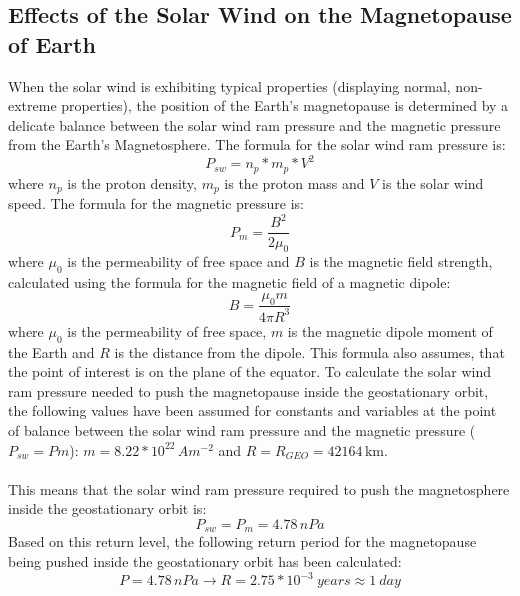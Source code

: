 \documentclass[12pt]{article}
\begin{document}
    \subsection{Effects of the Solar Wind on the Magnetopause of Earth}\label{sec:magnetoPAUSE}
        When the solar wind is exhibiting typical properties (displaying normal, non-extreme properties), the position of the Earth's magnetopause is determined by a delicate balance between the solar wind ram pressure and the magnetic pressure from the Earth's Magnetosphere. The formula for the solar wind ram pressure is:
        \begin{equation}
            P_{sw}=n_p*m_p*V^2
        \end{equation}
        where $n_p$ is the proton density, $m_p$ is the proton mass and $V$ is the solar wind speed. The formula for the magnetic pressure is:
        \begin{equation}
            P_{m}=\frac{B^2}{2\mu_0}
        \end{equation}
        where $\mu_0$ is the permeability of free space and $B$ is the magnetic field strength, calculated using the formula for the magnetic field of a magnetic dipole:
        \begin{equation}
            B=\frac{\mu_0m}{4\pi R^3}
        \end{equation}
        where $\mu_0$ is the permeability of free space, $m$ is the magnetic dipole moment of the Earth and $R$ is the distance from the dipole. This formula also assumes, that the point of interest is on the plane of the equator. To calculate the solar wind ram pressure needed to push the magnetopause inside the geostationary orbit, the following values have been assumed for constants and variables at the point of balance between the solar wind ram pressure and the magnetic pressure ($P_{sw}=P{m}$): $m=8.22*10^{22}\,Am^{-2}$ and $R=R_{GEO}=42164\,$km.\\ \\
        This means that the solar wind ram pressure required to push the magnetosphere inside the geostationary orbit is:
        \begin{equation}
            P_{sw}=P_{m}=4.78\, nPa
        \end{equation}
        Based on this return level, the following return period for the magnetopause being pushed inside the geostationary orbit has been calculated:
        \begin{equation}
            P=4.78\, nPa\rightarrow R=2.75*10^{-3}\ years\approx1\ day
        \end{equation}
\end{document}
